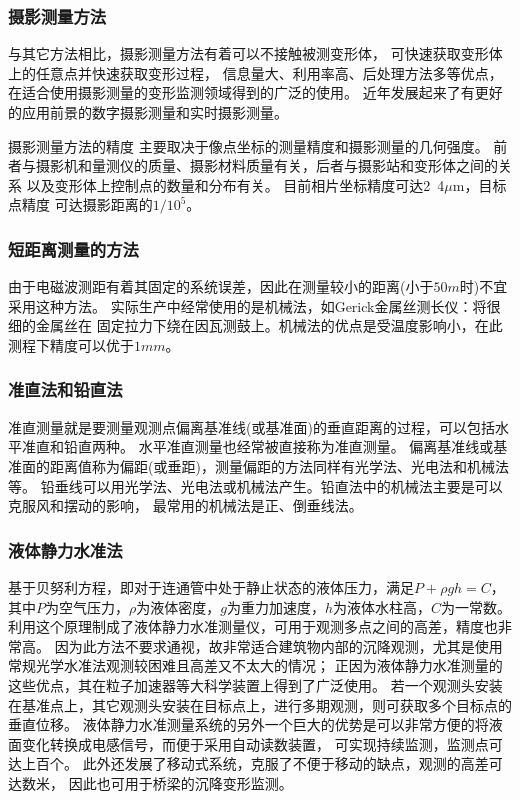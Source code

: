 \subsubsection*{摄影测量方法}
与其它方法相比，摄影测量方法有着可以不接触被测变形体，
可快速获取变形体上的任意点并快速获取变形过程，
信息量大、利用率高、后处理方法多等优点，
在适合使用摄影测量的变形监测领域得到的广泛的使用。
近年发展起来了有更好的应用前景的数字摄影测量和实时摄影测量。

摄影测量方法的精度
主要取决于像点坐标的测量精度和摄影测量的几何强度。
前者与摄影机和量测仪的质量、摄影材料质量有关，后者与摄影站和变形体之间的关系
以及变形体上控制点的数量和分布有关。
目前相片坐标精度可达2~4${\mu}$m，目标点精度
可达摄影距离的${1/10^5}$。
\subsubsection*{短距离测量的方法}
由于电磁波测距有着其固定的系统误差，因此在测量较小的距离(小于$50m$时)不宜采用这种方法。
实际生产中经常使用的是机械法，如Gerick金属丝测长仪：将很细的金属丝在
固定拉力下绕在因瓦测鼓上。机械法的优点是受温度影响小，在此测程下精度可以优于$1mm$。
\subsubsection*{准直法和铅直法}
准直测量就是要测量观测点偏离基准线(或基准面)的垂直距离的过程，可以包括水平准直和铅直两种。
水平准直测量也经常被直接称为准直测量。
偏离基准线或基准面的距离值称为偏距(或垂距)，测量偏距的方法同样有光学法、光电法和机械法等。
铅垂线可以用光学法、光电法或机械法产生。铅直法中的机械法主要是可以克服风和摆动的影响，
最常用的机械法是正、倒垂线法。
\subsubsection*{液体静力水准法}
基于贝努利方程，即对于连通管中处于静止状态的液体压力，满足$P+{\rho}gh=C$，
其中$P$为空气压力，$\rho$为液体密度，$g$为重力加速度，$h$为液体水柱高，$C$为一常数。
利用这个原理制成了液体静力水准测量仪，可用于观测多点之间的高差，精度也非常高。
因为此方法不要求通视，故非常适合建筑物内部的沉降观测，尤其是使用常规光学水准法观测较困难且高差又不太大的情况；
正因为液体静力水准测量的这些优点，其在粒子加速器等大科学装置上得到了广泛使用。
若一个观测头安装在基准点上，其它观测头安装在目标点上，进行多期观测，则可获取多个目标点的垂直位移。
液体静力水准测量系统的另外一个巨大的优势是可以非常方便的将液面变化转换成电感信号，而便于采用自动读数装置，
可实现持续监测，监测点可达上百个。
此外还发展了移动式系统，克服了不便于移动的缺点，观测的高差可达数米，
因此也可用于桥梁的沉降变形监测。
